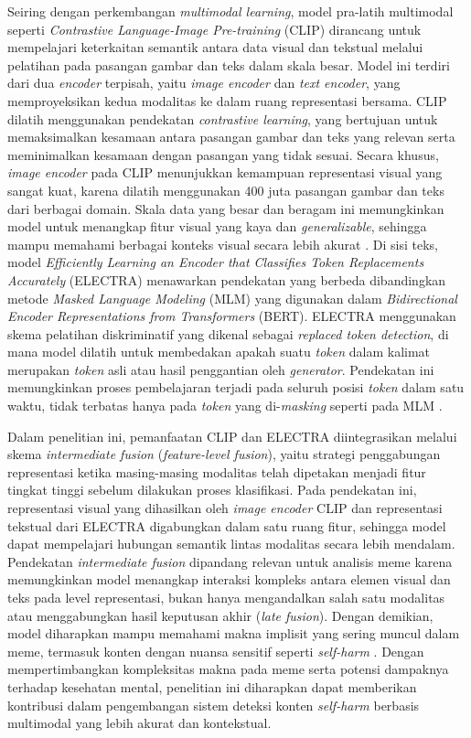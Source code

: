 Seiring dengan perkembangan \textit{multimodal learning}, model pra-latih multimodal seperti \textit{Contrastive Language-Image Pre-training} (CLIP) dirancang untuk mempelajari keterkaitan semantik antara data visual dan tekstual melalui pelatihan pada pasangan gambar dan teks dalam skala besar. Model ini terdiri dari dua \textit{encoder} terpisah, yaitu \textit{image encoder} dan \textit{text encoder}, yang memproyeksikan kedua modalitas ke dalam ruang representasi bersama. CLIP dilatih menggunakan pendekatan \textit{contrastive learning}, yang bertujuan untuk memaksimalkan kesamaan antara pasangan gambar dan teks yang relevan serta meminimalkan kesamaan dengan pasangan yang tidak sesuai. Secara khusus, \textit{image encoder} pada CLIP menunjukkan kemampuan representasi visual yang sangat kuat, karena dilatih menggunakan 400 juta pasangan gambar dan teks dari berbagai domain. Skala data yang besar dan beragam ini memungkinkan model untuk menangkap fitur visual yang kaya dan \textit{generalizable}, sehingga mampu memahami berbagai konteks visual secara lebih akurat \cite{radford2021clip}. Di sisi teks, model \textit{Efficiently Learning an Encoder that Classifies Token Replacements Accurately} (ELECTRA) menawarkan pendekatan yang berbeda dibandingkan metode \textit{Masked Language Modeling} (MLM) yang digunakan dalam \textit{Bidirectional Encoder Representations from Transformers} (BERT). ELECTRA menggunakan skema pelatihan diskriminatif yang dikenal sebagai \textit{replaced token detection}, di mana model dilatih untuk membedakan apakah suatu \textit{token} dalam kalimat merupakan \textit{token} asli atau hasil penggantian oleh \textit{generator}. Pendekatan ini memungkinkan proses pembelajaran terjadi pada seluruh posisi \textit{token} dalam satu waktu, tidak terbatas hanya pada \textit{token} yang di-\textit{masking} seperti pada MLM \cite{clark2020electra}. 

Dalam penelitian ini, pemanfaatan CLIP dan ELECTRA  diintegrasikan melalui skema \textit{intermediate fusion} (\textit{feature-level fusion}), yaitu strategi penggabungan representasi ketika masing-masing modalitas telah dipetakan menjadi fitur tingkat tinggi sebelum dilakukan proses klasifikasi. Pada pendekatan ini, representasi visual yang dihasilkan oleh \textit{image encoder} CLIP dan representasi tekstual dari ELECTRA digabungkan dalam satu ruang fitur, sehingga model dapat mempelajari hubungan semantik lintas modalitas secara lebih mendalam. Pendekatan \textit{intermediate fusion} dipandang relevan untuk analisis meme karena memungkinkan model menangkap interaksi kompleks antara elemen visual dan teks pada level representasi, bukan hanya mengandalkan salah satu modalitas atau menggabungkan hasil keputusan akhir (\textit{late fusion}). Dengan demikian, model diharapkan mampu memahami makna implisit yang sering muncul dalam meme, termasuk konten dengan nuansa sensitif seperti \textit{self-harm} \cite{boulahia2021fusion}. Dengan mempertimbangkan kompleksitas makna pada meme serta potensi dampaknya terhadap kesehatan mental, penelitian ini diharapkan dapat memberikan kontribusi dalam pengembangan sistem deteksi konten \textit{self-harm} berbasis multimodal yang lebih akurat dan kontekstual.

